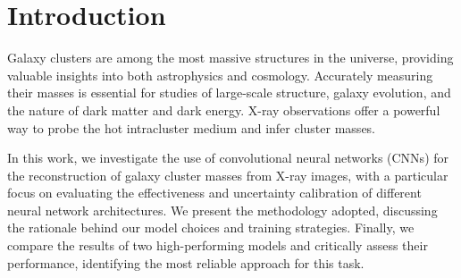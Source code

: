 \section{Introduction}

Galaxy clusters are among the most massive structures in the universe, 
providing valuable insights into both astrophysics and cosmology. 
Accurately measuring their masses is essential for studies of large-scale 
structure, galaxy evolution, and the nature of dark matter and dark energy. 
X-ray observations offer a powerful way to probe the hot intracluster medium 
and infer cluster masses.

In this work, we investigate the use of convolutional neural networks (CNNs) 
for the reconstruction of galaxy cluster masses from X-ray images, with a
particular focus on evaluating the effectiveness and uncertainty calibration
of different neural network architectures. We present the methodology adopted, 
discussing the rationale behind our model choices and training strategies. 
Finally, we compare the results of two high-performing models and critically 
assess their performance, identifying the most reliable approach for this task.
